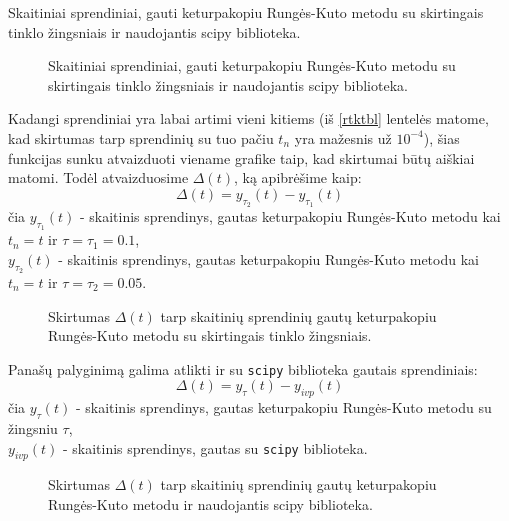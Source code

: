 \documentclass[]{VUMIFTemplateClass}
\newcommand{\tone}{0.1}
\newcommand{\ttwo}{0.05}
\begin{document}
\begin{table}[H]
    \begin{center}
        
    \end{center}
    \caption{Skaitiniai sprendiniai, gauti keturpakopiu Rungės-Kuto metodu su skirtingais tinklo žingsniais ir naudojantis scipy biblioteka.}
    \label{rtktbl}
\end{table}

\begin{figure}[H]
    \begin{center}
        
    \end{center}
    \caption{Skaitiniai sprendiniai, gauti keturpakopiu Rungės-Kuto metodu su skirtingais tinklo žingsniais ir naudojantis scipy biblioteka.}
\end{figure}

Kadangi sprendiniai yra labai artimi vieni kitiems (iš \ref{rtktbl} lentelės matome, kad skirtumas tarp sprendinių su tuo pačiu $t_n$ yra mažesnis už $10^{-4}$), šias funkcijas sunku atvaizduoti viename grafike taip, kad skirtumai būtų aiškiai matomi. Todėl atvaizduosime $\Delta(t)$, ką apibrėšime kaip:\\
\[ \Delta(t) = y_{\tau_2}(t) - y_{\tau_1}(t) \]
čia $y_{\tau_1}(t)$ - skaitinis sprendinys, gautas keturpakopiu Rungės-Kuto metodu kai $t_n = t$ ir $\tau = \tau_1 = \tone$,\\
$y_{\tau_2}(t)$ - skaitinis sprendinys, gautas keturpakopiu Rungės-Kuto metodu kai $t_n = t$ ir $\tau = \tau_2 = \ttwo$.

\begin{figure}[H]
    \begin{center}
        
    \end{center}
    \caption{Skirtumas $\Delta(t)$ tarp skaitinių sprendinių gautų keturpakopiu Rungės-Kuto metodu su skirtingais tinklo žingsniais.}
\end{figure}

Panašų palyginimą galima atlikti ir su \texttt{scipy} biblioteka gautais sprendiniais:\\
\[ \Delta(t) = y_{\tau}(t) - y_{ivp}(t) \]
čia $y_{\tau}(t)$ - skaitinis sprendinys, gautas keturpakopiu Rungės-Kuto metodu su žingsniu $\tau$,\\
$y_{ivp}(t)$ - skaitinis sprendinys, gautas su \texttt{scipy} biblioteka.
\begin{figure}[H]
    \begin{center}
        
    \end{center}
    \caption{Skirtumas $\Delta(t)$ tarp skaitinių sprendinių gautų keturpakopiu Rungės-Kuto metodu ir naudojantis scipy biblioteka.}
\end{figure}
\end{document}
